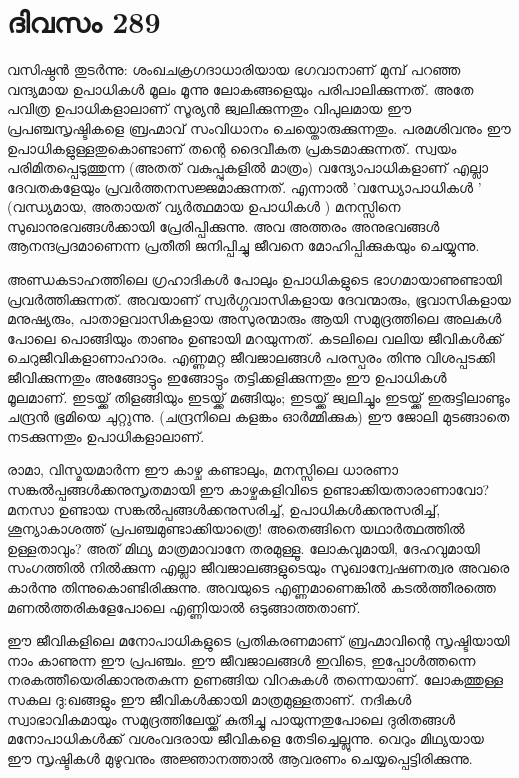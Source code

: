 \section{ദിവസം 289}


വസിഷ്ഠന്‍ തുടര്‍ന്നു: ശംഖചക്രഗദാധാരിയായ ഭഗവാനാണ് മുമ്പ് പറഞ്ഞ വന്ദ്യമായ ഉപാധികള്‍ മൂലം മൂന്നു ലോകങ്ങളെയും പരിപാലിക്കുന്നത്.  അതേ പവിത്ര ഉപാധികളാലാണ് സൂര്യന്‍ ജ്വലിക്കുന്നതും വിപുലമായ ഈ പ്രപഞ്ചസൃഷ്ടികളെ ബ്രഹ്മാവ്‌ സംവിധാനം ചെയ്തൊരുക്കുന്നതും. പരമശിവനും ഈ ഉപാധികളുള്ളതുകൊണ്ടാണ് തന്റെ ദൈവീകത പ്രകടമാക്കുന്നത്. സ്വയം പരിമിതപ്പെടുത്തുന്ന (അതത് വകുപ്പുകളില്‍ മാത്രം) വന്ദ്യോപാധികളാണ് എല്ലാ ദേവതകളേയും പ്രവര്‍ത്തനസജ്ജമാക്കുന്നത്. എന്നാല്‍ 'വന്ധ്യോപാധികള്‍ '  (വന്ധ്യമായ, അതായത് വ്യര്‍ത്ഥമായ ഉപാധികള്‍ ) മനസ്സിനെ സുഖാനുഭവങ്ങള്‍ക്കായി പ്രേരിപ്പിക്കുന്നു. അവ അത്തരം അനുഭവങ്ങള്‍ ആനന്ദപ്രദമാണെന്ന പ്രതീതി ജനിപ്പിച്ചു ജീവനെ മോഹിപ്പിക്കുകയും ചെയ്യുന്നു. 

അണ്ഡകടാഹത്തിലെ ഗ്രഹാദികള്‍ പോലും ഉപാധികളുടെ ഭാഗമായാണുണ്ടായി പ്രവര്‍ത്തിക്കുന്നത്. അവയാണ് സ്വര്‍ഗ്ഗവാസികളായ ദേവന്മാരും, ഭൂവാസികളായ മനുഷ്യരും, പാതാളവാസികളായ അസുരന്മാരും ആയി സമുദ്രത്തിലെ അലകള്‍ പോലെ പൊങ്ങിയും താണും ഉണ്ടായി മറയുന്നത്. കടലിലെ വലിയ ജീവികള്‍ക്ക് ചെറുജീവികളാണാഹാരം. എണ്ണമറ്റ ജീവജാലങ്ങള്‍ പരസ്പരം തിന്നു വിശപ്പടക്കി ജീവിക്കുന്നതും അങ്ങോട്ടും ഇങ്ങോട്ടും തട്ടിക്കളിക്കുന്നതും ഈ ഉപാധികള്‍ മൂലമാണ്. ഇടയ്ക്ക് തിളങ്ങിയും ഇടയ്ക്ക് മങ്ങിയും; ഇടയ്ക്ക് ജ്വലിച്ചും ഇടയ്ക്ക് ഇരുട്ടിലാണ്ടും ചന്ദ്രന്‍ ഭൂമിയെ ചുറ്റുന്നു. (ചന്ദ്രനിലെ കളങ്കം ഓര്‍മ്മിക്കുക) ഈ ജോലി മുടങ്ങാതെ നടക്കുന്നതും ഉപാധികളാലാണ്. 

രാമാ, വിസ്മയമാര്‍ന്ന ഈ കാഴ്ച കണ്ടാലും, മനസ്സിലെ ധാരണാ സങ്കല്‍പ്പങ്ങള്‍ക്കനുസൃതമായി ഈ കാഴ്ചകളിവിടെ ഉണ്ടാക്കിയതാരാണാവോ? മനസാ ഉണ്ടായ സങ്കല്‍പ്പങ്ങള്‍ക്കനുസരിച്ച്, ഉപാധികള്‍ക്കനുസരിച്ച്, ശൂന്യാകാശത്ത് പ്രപഞ്ചമുണ്ടാക്കിയാത്രെ! അതെങ്ങിനെ യഥാര്‍ത്ഥത്തില്‍ ഉള്ളതാവും? അത് മിഥ്യ മാത്രമാവാനേ തരമുള്ളൂ. ലോകവുമായി, ദേഹവുമായി സംഗത്തില്‍ നില്‍ക്കുന്ന എല്ലാ ജീവജാലങ്ങളുടെയും സുഖാന്വേഷണത്വര അവരെ കാര്‍ന്നു തിന്നുകൊണ്ടിരിക്കുന്നു. അവയുടെ എണ്ണമാണെങ്കില്‍ കടല്‍ത്തീരത്തെ മണല്‍ത്തരികളേപോലെ എണ്ണിയാല്‍ ഒടുങ്ങാത്തതാണ്.

ഈ ജീവികളിലെ മനോപാധികളുടെ പ്രതികരണമാണ് ബ്രഹ്മാവിന്റെ സൃഷ്ടിയായി നാം കാണുന്ന ഈ പ്രപഞ്ചം. ഈ ജീവജാലങ്ങള്‍ ഇവിടെ, ഇപ്പോള്‍ത്തന്നെ നരകത്തീയെരിക്കാനുതകുന്ന ഉണങ്ങിയ വിറകുകള്‍ തന്നെയാണ്. ലോകത്തുള്ള സകല ദു:ഖങ്ങളും ഈ ജീവികള്‍ക്കായി മാത്രമുള്ളതാണ്. നദികള്‍ സ്വാഭാവികമായും സമുദ്രത്തിലേയ്ക്ക് കുതിച്ചു പായുന്നതുപോലെ ദുരിതങ്ങള്‍ മനോപാധികള്‍ക്ക് വശംവദരായ ജീവികളെ തേടിച്ചെല്ലുന്നു. വെറും മിഥ്യയായ ഈ  സൃഷ്ടികള്‍ മുഴുവനും അജ്ഞാനത്താല്‍ ആവരണം ചെയ്യപ്പെട്ടിരിക്കുന്നു.

